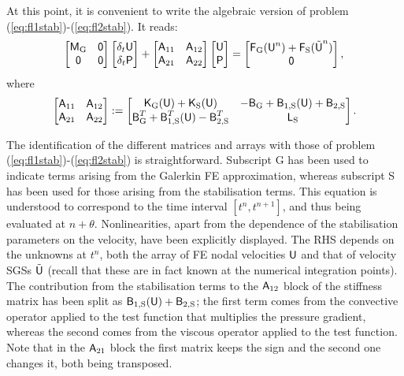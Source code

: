 \documentclass[11pt,a4paper,oneside,reqno]{amsart}
\newcommand{\Eq}[1]{(\ref{eq:#1})}
\def\el{{\nonumber}}
\def\mA{\hbox{{\sffamily A}}}
\def\mB{\hbox{{\sffamily B}}}
\def\mL{\hbox{{\sffamily L}}}
\def\mM{\hbox{{\sffamily M}}}
\def\mK{\hbox{{\sffamily K}}}
\def\mU{\hbox{{\sffamily U}}}
\def\mP{\hbox{{\sffamily P}}}
\def\mF{\hbox{{\sffamily F}}}
\def\mzero{\hbox{{\sffamily 0}}}
\begin{document}
At this point, it is convenient to write the algebraic version of problem \Eq{fl1stab}-\Eq{fl2stab}. It reads:
\begin{align}
\left[ \begin{matrix} 
\mM_{\rm G}  & \mzero \cr
\mzero & \mzero 
\end{matrix}\right]
\left[ \begin{matrix} \delta_t \mU \cr \delta_t \mP
\end{matrix}\right]
+ \left[ \begin{matrix} 
\mA_{11} & \mA_{12}  \cr
\mA_{21} & \mA_{22}
\end{matrix}\right]
\left[ \begin{matrix} \mU \cr \mP
\end{matrix}\right]
= \left[ \begin{matrix} \mF_{\rm G}  ({\mU}^n) + \mF_{\rm S} (\tilde{\mU}^n) \cr \mzero
\end{matrix}\right],\el
\end{align}
where
\begin{align}
 \left[ \begin{matrix} 
\mA_{11} & \mA_{12}  \cr
\mA_{21} & \mA_{22}
\end{matrix}\right] :=
\left[ \begin{matrix} 
\mK_{\rm G}(\mU) 
+  \mK_{\rm S}(\mU)  & - \mB_{\rm G} +\mB_{1,\rm S}(\mU) +\mB_{2,\rm S}  \cr
\mB_{\rm G}^T +\mB^T_{1,\rm S}(\mU) - \mB^T_{2,\rm S} & \mL_{\rm S} 
\end{matrix}\right].\label{eq:matA1}
\end{align}

The identification of the different matrices and arrays with those of problem \Eq{fl1stab}-\Eq{fl2stab} is straightforward. Subscript G has been used to indicate terms arising from the Galerkin FE approximation, whereas subscript S has been used for those arising from the stabilisation terms. This equation is understood to correspond to the time interval $[t^n,t^{n+1}]$, and thus being evaluated at $n+\theta$. Nonlinearities, apart from the dependence of the stabilisation parameters on the velocity, have been explicitly displayed. The RHS depends on the unknowns at $t^n$, both the array of FE nodal velocities $\mU$ and that of velocity SGSs $\tilde{\mU}$ (recall that these are in fact known at the numerical integration points). The contribution from the stabilisation terms to the $\mA_{12}$ block of the stiffness matrix has been split as $\mB_{1,{\rm S}}(\mU) + \mB_{2,{\rm S}}$; the first term comes from the convective operator applied to the test function that multiplies the pressure gradient, whereas the second comes from the viscous operator applied to the test function. Note that in the $\mA_{21}$ block the first matrix keeps the sign and the second one changes it, both being transposed.
\end{document}
